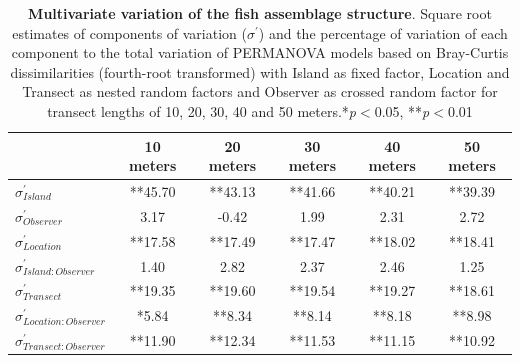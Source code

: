 \documentclass[10pt,letterpaper]{article}
\begin{document}
\renewcommand{\arraystretch}{1.5}
\begin{table}
\centering
\scriptsize
\caption{{\bf Multivariate variation of the fish assemblage structure}. Square root estimates of components of variation ($\sigma^{'}$) and %
the percentage of variation of each component to the total variation of PERMANOVA models  based on Bray-Curtis dissimilarities (fourth-root transformed) with Island as fixed factor, Location and Transect as nested random factors and Observer as crossed random factor for transect lengths of 10, 20, 30, 40 and 50 meters.*\textit{p}$<$0.05, **\textit{p}$<$0.01}
\label{PERMANOVAvar}
\begin{tabular}{l|ccccc} 
\toprule
                                  & \multicolumn{1}{c}{10 meters} & \multicolumn{1}{c}{20 meters} & \multicolumn{1}{c}{30 meters} & \multicolumn{1}{c}{40 meters} & \multicolumn{1}{c}{50 meters}  \\ 
\midrule
$\sigma^{'}_{Island}$             & **45.70                       & **43.13                       & **41.66                       & **40.21                       & **39.39                        \\ 
$\sigma^{'}_{Observer}$           & 3.17                          & -0.42                         & 1.99                          & 2.31                          & 2.72                           \\ 
$\sigma^{'}_{Location}$           & **17.58                       & **17.49                       & **17.47                       & **18.02                       & **18.41                        \\ 
$\sigma^{'}_{Island:Observer}$    & 1.40                          & 2.82                          & 2.37                          & 2.46                          & 1.25                           \\ 
$\sigma^{'}_{Transect}$           & **19.35                       & **19.60                       & **19.54                       & **19.27                       & **18.61                        \\ 
$\sigma^{'}_{Location:Observer}$  & *5.84                         & **8.34                        & **8.14                        & **8.18                        & **8.98                         \\ 
$\sigma^{'}_{Transect:Observer}$  & **11.90                       & **12.34                       & **11.53                       & **11.15                       & **10.92                        \\ 

\end{tabular}
\end{table}
\end{document}
